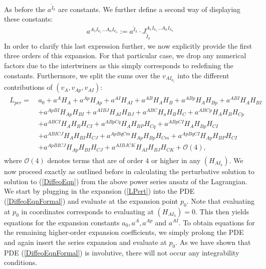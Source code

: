 As before the $a^{\tilde{I}_k}$ are constants.
We further define a second way of displaying these constants:
\begin{align}
    a^{A_1I_{k_1}...A_nI_{k_n}} := a^{\tilde{I}_k} \cdot J_{\tilde{I}_k}^{A_1I_{k_1}...A_nI_{k_n}}
\end{align}
In order to clarify this last expression further, we now explicitly provide the first three orders of this expansion. For that particular case, we drop any numerical factors due to the intertwiners as this simply corresponds to redefining the constants. Furthermore, we split the sums over the $v_{AI_{k_i}}$ into the different contributions of $(v_A,v_{Ap},v_{AI})$:
\begin{align}\label{LPert}
\begin{aligned}
    L_{per} = \  &a_0 + a^A H_A + a^{Ap} H_{Ap} + a^{AI}H_{AI} + a^{AB} H_{A}H_{B} + a^{ABp}H_A H_{Bp} + a^{ABI} H_{A} H_{BI}\\
    &+a^{ApBI}H_{Ap} H_{BI} + a^{AIBJ} H_{AI}H_{BJ} + a^{ABC} H_a H_B H_C 
    + a^{ABCp} H_A H_B H_{Cp} \\
    &+a^{ABCI} H_A H_B H_{CI} + a^{ABpCq} H_{A}H_{BP}H_{Cq} + a^{ABpCI} H_A H_{Bp} H_{CI}\\
    &+ a^{ABICJ} H_A H_{BI}H_{CJ} 
    + a^{ApBqCm} H_{Ap} H_{Bp} H_{Cm}+ a^{ApBq CI} H_{Ap} H_{BP} H_{CI}\\
    &+ a^{Ap BI CJ} H_{Ap} H_{BI} H_{CJ} + a^{AIBJCK} H_{AI} H_{BJ} H_{CK} + \mathcal{O}(4),
\end{aligned}
\end{align}
where $\mathcal{O}(4)$ denotes terms that are of order $4$ or higher in any $(H_{AI_k})$. We now proceed exactly as outlined before in calculating the perturbative solution to solution to (\ref{DiffeoEqn}) from the above power series ansatz of the Lagrangian. We start by plugging in the expansion (\ref{LPert}) into the PDE (\ref{DiffeoEqnFormal}) and evaluate at the expansion point $p_0$. Note that evaluating at $p_0$ in coordinates corresponds to evaluating at $(H_{AI_k})=0$. This then yields equations for the expansion constants $a_0, a^A, a^{Ap}$ and $a^{AI}$. To obtain equations for the remaining higher-order expansion coefficients, we simply prolong the PDE and again insert the series expansion and evaluate at $p_0$. As we have shown that PDE (\ref{DiffeoEqnFormal}) is involutive, there will not occur any integrability conditions.

